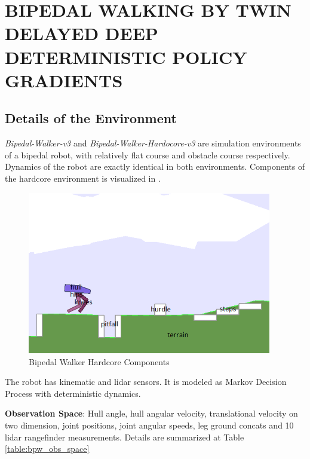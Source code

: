 \chapter{BIPEDAL WALKING BY TWIN DELAYED DEEP DETERMINISTIC POLICY GRADIENTS}
\label{chap:exp_setup}

\section{Details of the Environment}

\textit{Bipedal-Walker-v3} and \textit{Bipedal-Walker-Hardocore-v3} are simulation environments of a bipedal robot, with relatively flat course and obstacle course respectively. Dynamics of the robot are exactly identical in both environments. Components of the hardcore environment is visualized in .

\begin{figure}
	\centering
	\includegraphics[width=0.95\textwidth]{figures/bipedal/bipedal_annotated.png}
	\caption{Bipedal Walker Hardcore Components}
	\label{fig:bipedal_hardcore_components}
\end{figure}

The robot has kinematic and lidar sensors. It is modeled as Markov Decision Process with deterministic dynamics. 

\textbf{Observation Space}: Hull angle, hull angular velocity, translational velocity on two dimension, joint positions, joint angular speeds, leg ground concats and 10 lidar rangefinder measurements. Details are summarized at Table \ref{table:bpw_obs_space}

